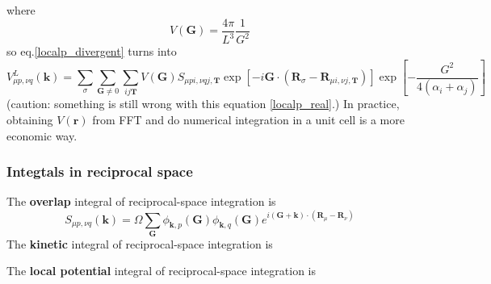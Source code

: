 \documentclass{article}
\begin{document}
            where
            \begin{equation}
                V(\textbf{G}) = \frac{4\pi}{L^3}\frac{1}{G^2}
            \end{equation}
            so eq.\eqref{localp_divergent} turns into
            \begin{equation}
                V_{\mu p,\nu q}^L(\textbf{k}) = \sum_{\sigma}\sum_{\textbf{G}\neq 0}\sum_{ij\textbf{T}}V(\textbf{G})S_{\mu pi,\nu qj,\textbf{T}}
                \exp\left[-i\textbf{G}\cdot(\textbf{R}_{\sigma}-\textbf{R}_{\mu i,\nu j,\textbf{T}})\right]\exp\left[-\frac{G^2}{4(\alpha_i+\alpha_j)}\right]\label{localp_real}
            \end{equation}
            (caution: something is still wrong with this equation \eqref{localp_real}.)
            In practice, obtaining $V(\textbf{r})$ from FFT and do numerical integration in a unit cell is a more economic way.
            

        \subsubsection{Integtals in reciprocal space}
            The \textbf{overlap} integral of reciprocal-space integration is
            \begin{equation}
                S_{\mu p,\nu q}(\textbf{k}) = \Omega\sum_{\textbf{G}}\phi_{\textbf{k},p}(\textbf{G})\phi_{\textbf{k},q}(\textbf{G})e^{i(\textbf{G}+\textbf{k})\cdot(\textbf{R}_{\mu}-\textbf{R}_{\nu})}
            \end{equation}
            The \textbf{kinetic} integral of reciprocal-space integration is

            The \textbf{local potential} integral of reciprocal-space integration is
            
            
\end{document}

